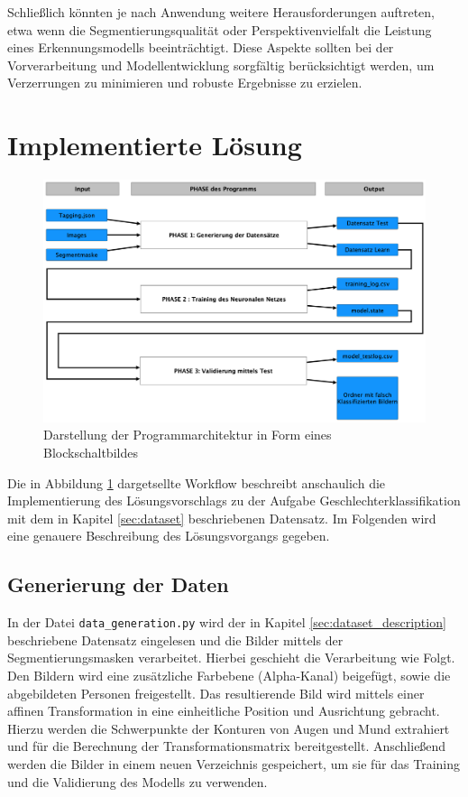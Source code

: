 \documentclass[journal,twoside,web]{ieeecolor}
\begin{document}
Schließlich könnten je nach Anwendung weitere Herausforderungen auftreten, etwa wenn die Segmentierungsqualität oder Perspektivenvielfalt die Leistung eines Erkennungsmodells beeinträchtigt. Diese Aspekte sollten bei der Vorverarbeitung und Modellentwicklung sorgfältig berücksichtigt werden, um Verzerrungen zu minimieren und robuste Ergebnisse zu erzielen.

\section{Implementierte Lösung}

\begin{figure}[H]
    \centerline{\includegraphics[width=\columnwidth]{Architektur.png}}
    \caption{Darstellung der Programmarchitektur in Form eines Blockschaltbildes}
    \label{fig:architecture}
\end{figure}

Die in Abbildung \ref{fig:architecture} dargetsellte Workflow beschreibt anschaulich die Implementierung des Lösungsvorschlags zu der Aufgabe Geschlechterklassifikation mit dem in Kapitel \ref{sec:dataset} beschriebenen Datensatz.
Im Folgenden wird eine genauere Beschreibung des Lösungsvorgangs gegeben.

\subsection{Generierung der Daten}
In der Datei \texttt{data\_generation.py} wird der in Kapitel \ref{sec:dataset_description} beschriebene Datensatz eingelesen und die Bilder mittels der Segmentierungsmasken verarbeitet. Hierbei geschieht die Verarbeitung wie Folgt. Den Bildern wird eine zusätzliche Farbebene (Alpha-Kanal) beigefügt, sowie die abgebildeten Personen freigestellt. Das resultierende Bild wird mittels einer affinen Transformation in eine einheitliche Position und Ausrichtung gebracht. Hierzu werden die Schwerpunkte der Konturen von Augen und Mund extrahiert und für die Berechnung der Transformationsmatrix bereitgestellt. Anschließend werden die Bilder in einem neuen Verzeichnis gespeichert, um sie für das Training und die Validierung des Modells zu verwenden.
\end{document}
